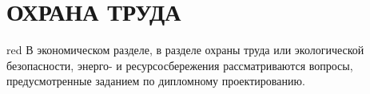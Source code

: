 \section[Охрана труда]{ОХРАНА ТРУДА}

\begin{color}{red}
  В экономическом разделе, в разделе охраны труда или экологической безопасности,
  энерго- и ресурсосбережения рассматриваются вопросы, предусмотренные
  заданием по дипломному проектированию.
\end{color}